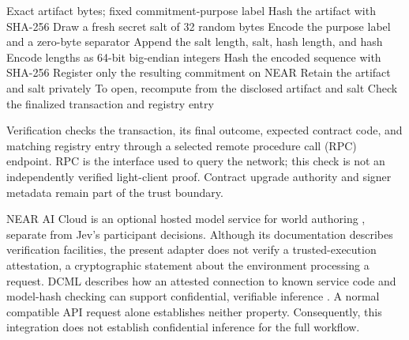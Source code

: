 \begin{algorithm}[t]
\caption{Registering and opening an artifact commitment}
\label{alg:commit}
\footnotesize
\begin{algorithmic}[1]
\Require Exact artifact bytes; fixed commitment-purpose label
\State Hash the artifact with SHA-256
\State Draw a fresh secret salt of 32 random bytes
\State Encode the purpose label and a zero-byte separator
\State Append the salt length, salt, hash length, and hash
\Statex \hspace{\algorithmicindent}Encode lengths as 64-bit big-endian integers
\State Hash the encoded sequence with SHA-256
\State Register only the resulting commitment on NEAR
\State Retain the artifact and salt privately
\State To open, recompute from the disclosed artifact and salt
\State Check the finalized transaction and registry entry
\end{algorithmic}
\end{algorithm}

Verification checks the transaction, its final outcome, expected contract code,
and matching registry entry through a selected remote procedure call (RPC)
endpoint. RPC is the interface used to query the network; this check is not
an independently verified light-client proof. Contract upgrade authority and
signer metadata remain part of the trust boundary.

NEAR AI Cloud is an optional hosted model service for world authoring
\cite{nearai}, separate from Jev's participant decisions. Although its
documentation describes verification facilities, the present adapter does
not verify a trusted-execution attestation, a cryptographic statement about
the environment processing a request. DCML describes how an attested connection
to known service code and model-hash checking can support confidential,
verifiable inference \cite{dcml}. A normal compatible API request alone
establishes neither property. Consequently, this integration does not
establish confidential inference for the full workflow.
